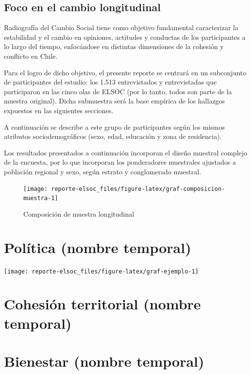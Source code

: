 \documentclass[
  12pt,
]{book}
\begin{document}
\hypertarget{foco-en-el-cambio-longitudinal}{%
\section{Foco en el cambio longitudinal}\label{foco-en-el-cambio-longitudinal}}

Radiografía del Cambio Social tiene como objetivo fundamental caracterizar la estabilidad y el cambio en opiniones, actitudes y conductas de los participantes a lo largo del tiempo, enfocándose en distintas dimensiones de la cohesión y conflicto en Chile.

Para el logro de dicho objetivo, el presente reporte se centrará en un subconjunto de participantes del estudio: los 1.513 entrevistados y entrevistadas que participaron en las cinco olas de ELSOC (por lo tanto, todos son parte de la muestra original). Dicha submuestra será la base empírica de los hallazgos expuestos en las siguientes secciones.

A continuación se describe a este grupo de participantes según los mismos atributos sociodemográficos (sexo, edad, educación y zona de residencia).

Los resultados presentados a continuación incorporan el diseño muestral complejo de la encuesta, por lo que incorporan los ponderadores muestrales ajustados a población regional y sexo, según estrato y conglomerado muestral.

\begin{figure}

{\centering \texttt{[image: reporte-elsoc\_files/figure-latex/graf-composicion-muestra-1]} 

}

\caption{Composición de muestra longitudinal}\label{fig:graf-composicion-muestra}
\end{figure}

\hypertarget{poluxedtica-nombre-temporal}{%
\chapter{Política (nombre temporal)}\label{poluxedtica-nombre-temporal}}

\begin{center}\texttt{[image: reporte-elsoc\_files/figure-latex/graf-ejemplo-1]} \end{center}

\hypertarget{cohesiuxf3n-territorial-nombre-temporal}{%
\chapter{Cohesión territorial (nombre temporal)}\label{cohesiuxf3n-territorial-nombre-temporal}}

\hypertarget{bienestar-nombre-temporal}{%
\chapter{Bienestar (nombre temporal)}\label{bienestar-nombre-temporal}}
\end{document}
